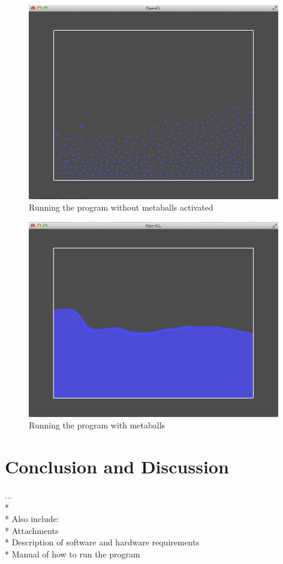\documentclass[a4paper,12pt,twoside]{report}
\begin{document}
\begin{figure}[h]
\begin{center}
    \includegraphics[width=11cm]{figs/image_2.png} 
\end{center}
\caption{Running the program without metaballs activated}
\label{model_block}
\end{figure}

\newpage{}

\begin{figure}[t]
\begin{center}
    \includegraphics[width=11cm]{figs/image_1.png} 
\end{center}
\caption{Running the program with metaballs}
\label{model_block}
\end{figure}



\chapter{Conclusion and Discussion}
...\\* \\*
Also include:\\*
Attachments\\*
Description of software and hardware requirements\\*
Manual of how to run the program
\end{document}
